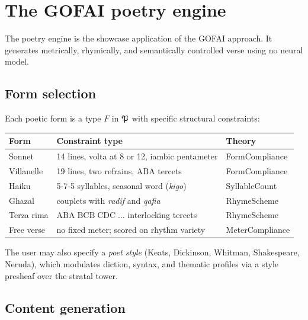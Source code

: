 \section{The GOFAI poetry engine}
\label{sec:gofai-poetry}

The poetry engine is the showcase application of the GOFAI approach.
It generates metrically, rhymically, and semantically controlled
verse using no neural model.

\subsection{Form selection}
\label{ssec:form-select}

Each poetic form is a type $F$ in $\mathfrak{P}$ with specific structural
constraints:
\begin{center}
\begin{tabular}{lll}
\textbf{Form} & \textbf{Constraint type} & \textbf{Theory} \\
\hline
Sonnet & 14 lines, volta at 8 or 12, iambic pentameter
       & \textsf{FormCompliance} \\
Villanelle & 19 lines, two refrains, $\mathrm{ABA}$ tercets
           & \textsf{FormCompliance} \\
Haiku & 5-7-5 syllables, seasonal word (\emph{kigo})
      & \textsf{SyllableCount} \\
Ghazal & couplets with \emph{radif} and \emph{qafia}
       & \textsf{RhymeScheme} \\
Terza rima & $\mathrm{ABA\;BCB\;CDC\;\dots}$ interlocking tercets
           & \textsf{RhymeScheme} \\
Free verse & no fixed meter; scored on rhythm variety
           & \textsf{MeterCompliance}
\end{tabular}
\end{center}
The user may also specify a \emph{poet style} (Keats, Dickinson,
Whitman, Shakespeare, Neruda), which modulates diction, syntax, and
thematic profiles via a style presheaf over the stratal tower.

\subsection{Content generation}
\label{ssec:content-gen}


